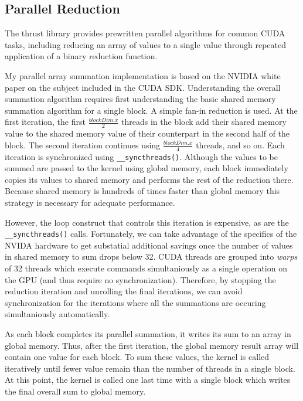 \documentclass{article}
\begin{document}
\subsection{Parallel Reduction}
The thrust library provides prewritten parallel algorithms for common CUDA tasks, including reducing an array of values to a single value through repeated application of a binary reduction function.\cite{thrust}

My parallel array summation implementation is based on the NVIDIA white paper on the subject included in the CUDA SDK.\cite{oprc} Understanding the overall summation algorithm requires first understanding the basic shared memory summation algorithm for a single block. A simple fan-in reduction is used. At the first iteration, the first \(\frac{blockDim.x}{2}\) threads in the block add their shared memory value to the shared memory value of their counterpart in the second half of the block. The second iteration continues using \(\frac{blockDim.x}{4}\) threads, and so on. Each iteration is synchronized using \verb!__syncthreads()!. Although the values to be summed are passed to the kernel using global memory, each block immediately copies its values to shared memory and performs the rest of the reduction there. Because shared memory is hundreds of times faster than global memory\cite{tutorial1} this strategy is necessary for adequate performance.

However, the loop construct that controls this iteration is expensive, as are the \verb!__syncthreads()! calls. Fortunately, we can take advantage of the specifics of the NVIDA hardware to get substatial additional savings once the number of values in shared memory to sum drops below 32. CUDA threads are grouped into \emph{warps} of 32 threads which execute commands simultaniously as a single operation on the GPU (and thus require no synchronization). Therefore, by stopping the reduction iteration and unrolling the final iterations, we can avoid synchronization for the iterations where all the summations are occuring simultaniously automatically.

As each block completes its parallel summation, it writes its sum to an array in global memory. Thus, after the first iteration, the global memory result array will contain one value for each block. To sum these values, the kernel is called iteratively until fewer value remain than the number of threads in a single block. At this point, the kernel is called one last time with a single block which writes the final overall sum to global memory.
\end{document}
